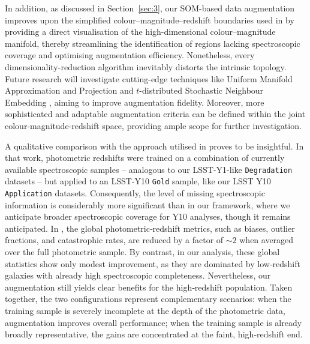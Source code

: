 In addition, as discussed in Section~\ref{sec:3}, our SOM-based data augmentation improves upon the simplified colour–magnitude–redshift boundaries used in \citet{2024ApJ...967L...6M} by providing a direct visualisation of the high-dimensional colour–magnitude manifold, thereby streamlining the identification of regions lacking spectroscopic coverage and optimising augmentation efficiency. Nonetheless, every dimensionality-reduction algorithm inevitably distorts the intrinsic topology. Future research will investigate cutting-edge techniques like Uniform Manifold Approximation and Projection \citep[UMAP;][]{2018arXiv180203426M} and \(t\)-distributed Stochastic Neighbour Embedding \citep[\(t\)-SNE;][]{vandermaatenJMLR:08a:v9}, aiming to improve augmentation fidelity. Moreover, more sophisticated and adaptable augmentation criteria can be defined within the joint colour-magnitude-redshift space, providing ample scope for further investigation.

A qualitative comparison with the approach utilised in \citet{2024ApJ...967L...6M} proves to be insightful. In that work, photometric redshifts were trained on a combination of currently available spectroscopic samples -- analogous to our LSST-Y1-like \texttt{Degradation} datasets -- but applied to an LSST-Y10 \texttt{Gold} sample, like our LSST Y10 \texttt{Application} datasets. Consequently, the level of missing spectroscopic information is considerably more significant than in our framework, where we anticipate broader spectroscopic coverage for Y10 analyses, though it remains anticipated. In \citet{2024ApJ...967L...6M}, the global photometric‐redshift metrics, such as biases, outlier fractions, and catastrophic rates, are reduced by a factor of \(\sim2\) when averaged over the full photometric sample. By contrast, in our analysis, these global statistics show only modest improvement, as they are dominated by low‐redshift galaxies with already high spectroscopic completeness. Nevertheless, our augmentation still yields clear benefits for the high‐redshift population. Taken together, the two configurations represent complementary scenarios: when the training sample is severely incomplete at the depth of the photometric data, augmentation improves overall performance; when the training sample is already broadly representative, the gains are concentrated at the faint, high‐redshift end.  

